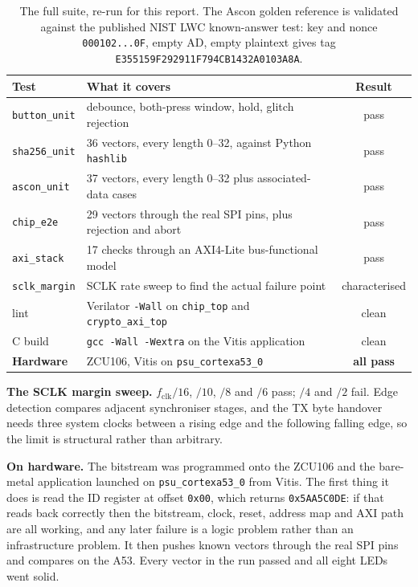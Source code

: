 \documentclass[11pt,a4paper]{article}
\begin{document}
\begin{table}[h]
\centering\small
\begin{tabular}{@{}llc@{}}
\toprule
\textbf{Test} & \textbf{What it covers} & \textbf{Result} \\
\midrule
\texttt{button\_unit} & debounce, both-press window, hold, glitch rejection & pass \\
\texttt{sha256\_unit} & 36 vectors, every length 0--32, against Python \texttt{hashlib} & pass \\
\texttt{ascon\_unit}  & 37 vectors, every length 0--32 plus associated-data cases & pass \\
\texttt{chip\_e2e}    & 29 vectors through the real SPI pins, plus rejection and abort & pass \\
\texttt{axi\_stack}   & 17 checks through an AXI4-Lite bus-functional model & pass \\
\texttt{sclk\_margin} & SCLK rate sweep to find the actual failure point & characterised \\
lint & Verilator \texttt{-Wall} on \texttt{chip\_top} and \texttt{crypto\_axi\_top} & clean \\
C build & \texttt{gcc -Wall -Wextra} on the Vitis application & clean \\
\midrule
\textbf{Hardware} & ZCU106, Vitis on \texttt{psu\_cortexa53\_0} & \textbf{all pass} \\
\bottomrule
\end{tabular}
\caption{The full suite, re-run for this report. The Ascon golden reference is
validated against the published NIST LWC known-answer test: key and nonce
\texttt{000102...0F}, empty AD, empty plaintext gives tag
\texttt{E355159F292911F794CB1432A0103A8A}.}
\end{table}

\textbf{The SCLK margin sweep.} $f_{\mathrm{clk}}/16$, $/10$, $/8$ and $/6$
pass; $/4$ and $/2$ fail. Edge detection compares adjacent synchroniser stages,
and the TX byte handover needs three system clocks between a rising edge and
the following falling edge, so the limit is structural rather than arbitrary.

\textbf{On hardware.} The bitstream was programmed onto the ZCU106 and the
bare-metal application launched on \texttt{psu\_cortexa53\_0} from Vitis. The
first thing it does is read the ID register at offset \texttt{0x00}, which
returns \texttt{0x5AA5C0DE}: if that reads back correctly then the bitstream,
clock, reset, address map and AXI path are all working, and any later failure
is a logic problem rather than an infrastructure problem. It then pushes known
vectors through the real SPI pins and compares on the A53. Every vector in the
run passed and all eight LEDs went solid.
\end{document}
